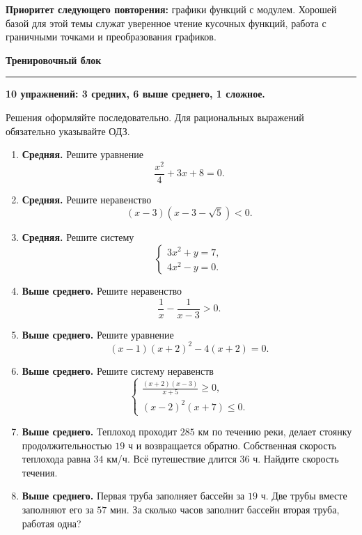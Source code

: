 \documentclass[a4paper,12pt]{article}
\newcommand{\topic}[1]{%
  \vspace{0.8em}%
  {\Large\bfseries\color{darkaccent}#1}\par
  \vspace{0.25em}%
  {\color{accent}\rule{\linewidth}{0.6pt}}\par
  \vspace{0.45em}%
}
\begin{document}
\textbf{Приоритет следующего повторения:}
графики функций с модулем. Хорошей базой для этой темы служат уверенное
чтение кусочных функций, работа с граничными точками и преобразования
графиков.


\clearpage

\topic{Тренировочный блок}

\textbf{10 упражнений: 3 средних, 6 выше среднего, 1 сложное.}

Решения оформляйте последовательно. Для рациональных выражений
обязательно указывайте ОДЗ.

\begin{enumerate}[label=\textbf{\arabic*.}]

\item
\textbf{Средняя.}
Решите уравнение
\[
\frac{x^2}{4}+3x+8=0.
\]

\item
\textbf{Средняя.}
Решите неравенство
\[
(x-3)(x-3-\sqrt5)<0.
\]

\item
\textbf{Средняя.}
Решите систему
\[
\begin{cases}
3x^2+y=7,\\
4x^2-y=0.
\end{cases}
\]

\item
\textbf{Выше среднего.}
Решите неравенство
\[
\frac1x-\frac1{x-3}>0.
\]

\item
\textbf{Выше среднего.}
Решите уравнение
\[
(x-1)(x+2)^2-4(x+2)=0.
\]

\item
\textbf{Выше среднего.}
Решите систему неравенств
\[
\begin{cases}
\displaystyle
\frac{(x+2)(x-3)}{x+5}\ge0,
\\[0.6em]
(x-2)^2(x+7)\le0.
\end{cases}
\]

\item
\textbf{Выше среднего.}
Теплоход проходит \(285\) км по течению реки, делает стоянку
продолжительностью \(19\) ч и возвращается обратно.
Собственная скорость теплохода равна \(34\) км/ч.
Всё путешествие длится \(36\) ч.
Найдите скорость течения.

\item
\textbf{Выше среднего.}
Первая труба заполняет бассейн за \(19\) ч.
Две трубы вместе заполняют его за \(57\) мин.
За сколько часов заполнит бассейн вторая труба, работая одна?


\end{enumerate}
\end{document}
